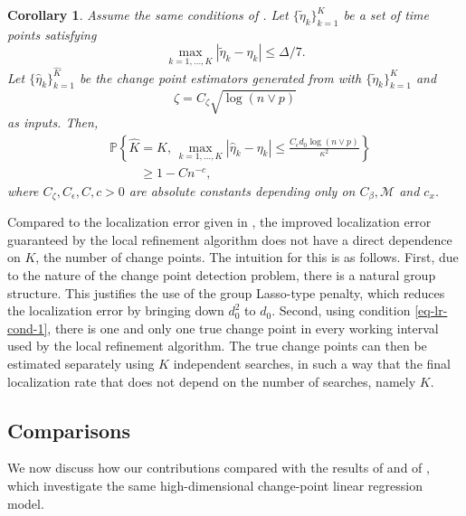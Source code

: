 \documentclass[twoside]{article}
\newtheorem{corollary}[theorem]{Corollary}
\begin{document}
\begin{corollary}\label{cor-lr-3}
Assume the same conditions of .
Let $\{\widetilde{\eta}_k\}_{k = 1}^{K}$ be a set of time points satisfying
	\begin{equation}\label{eq-lr-cond-1}
		\max_{k = 1, \ldots, K} |\widetilde{\eta}_k - \eta_k| \leq \Delta/7.
	\end{equation}
	Let $\{\widehat{\eta}_k\}_{k = 1}^{\widehat{K}}$ be the change point estimators generated from  with $\{\widetilde{\eta}_k\}_{k = 1}^{K}$ and 
	\[
		\zeta = C_{\zeta}\sqrt{\log(n \vee p)}
	\]
	as inputs.  Then,
	\begin{align*}
		& \mathbb{P}\left\{\widehat K = K, \, \max_{k = 1, \ldots, K}|\hat{\eta}_k - \eta_k| \leq \frac{C_{\epsilon} d_0 \log(n \vee p)}{\kappa^2} \right\} \\
		& \hspace{1cm}\geq 1 - Cn^{-c},
	\end{align*}
	where $C_{\zeta}, C_{\epsilon}, C, c > 0$ are absolute constants depending only on $C_{\beta}, \mathcal{M}$ and $c_x$.
\end{corollary}

Compared to the localization error given in , the improved localization error guaranteed by the local refinement algorithm does not have a direct dependence on $K$, the number of change points. The intuition for this is as follows.
First, due to the nature of the change point detection problem, there is a natural group structure.  This justifies the use of the group Lasso-type penalty, which reduces the localization error by bringing down $d_0^2$ to $d_0$. Second, using condition \eqref{eq-lr-cond-1}, there is one and only one true change point in every working interval used by the local refinement algorithm. The true change points can then be estimated separately using $K$ independent searches, in such a way that the final localization rate that does not depend on the number of searches, namely $K$.

\subsection{Comparisons}\label{sec-comparisons}

We now discuss how our contributions compared with the results of \cite{wang2019statistically} and of \cite{leonardi2016computationally}, which investigate the same high-dimensional change-point linear regression model.
\end{document}
